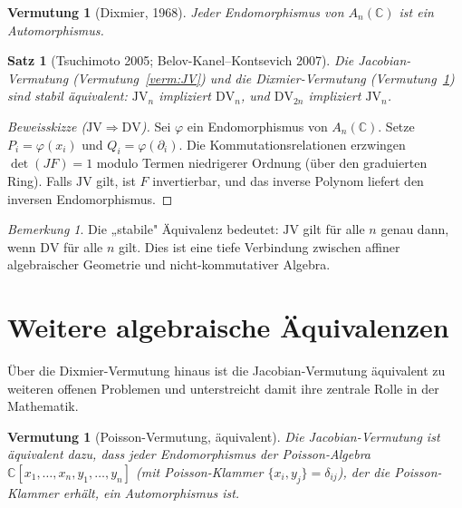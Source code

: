 \documentclass[12pt,a4paper]{amsart}
\newtheorem{satz}[theorem]{Satz}
\newtheorem{vermutung}[theorem]{Vermutung}
\theoremstyle{definition}
\theoremstyle{remark}
\newtheorem{bemerkung}[theorem]{Bemerkung}
\begin{document}
\begin{vermutung}[Dixmier, 1968]\label{verm:dixmier}
Jeder Endomorphismus von $A_n(\mathbb{C})$ ist ein Automorphismus.
\end{vermutung}

\begin{satz}[Tsuchimoto 2005; Belov-Kanel--Kontsevich 2007]\label{satz:JV=DV}
Die Jacobian-Vermutung (Vermutung~\ref{verm:JV}) und die Dixmier-Vermutung
(Vermutung~\ref{verm:dixmier}) sind stabil äquivalent: $\mathrm{JV}_n$ impliziert
$\mathrm{DV}_n$, und $\mathrm{DV}_{2n}$ impliziert $\mathrm{JV}_n$.
\end{satz}

\begin{proof}[Beweisskizze ($\mathrm{JV} \Rightarrow \mathrm{DV}$)]
Sei $\varphi$ ein Endomorphismus von $A_n(\mathbb{C})$. Setze $P_i = \varphi(x_i)$
und $Q_i = \varphi(\partial_i)$. Die Kommutationsrelationen erzwingen
$\det(JF) = 1$ modulo Termen niedrigerer Ordnung (über den graduierten Ring).
Falls $\mathrm{JV}$ gilt, ist $F$ invertierbar, und das inverse Polynom liefert
den inversen Endomorphismus.
\end{proof}

\begin{bemerkung}
Die „stabile" Äquivalenz bedeutet: $\mathrm{JV}$ gilt für alle $n$ genau dann,
wenn $\mathrm{DV}$ für alle $n$ gilt. Dies ist eine tiefe Verbindung zwischen
affiner algebraischer Geometrie und nicht-kommutativer Algebra.
\end{bemerkung}

\section{Weitere algebraische Äquivalenzen}
\label{abschn:equiv}

Über die Dixmier-Vermutung hinaus ist die Jacobian-Vermutung äquivalent zu weiteren
offenen Problemen und unterstreicht damit ihre zentrale Rolle in der Mathematik.

\begin{vermutung}[Poisson-Vermutung, äquivalent]\label{verm:poisson_equiv}
Die Jacobian-Vermutung ist äquivalent dazu, dass jeder Endomorphismus der
Poisson-Algebra $\mathbb{C}[x_1,\ldots,x_n, y_1,\ldots,y_n]$ (mit Poisson-Klammer
$\{x_i, y_j\} = \delta_{ij}$), der die Poisson-Klammer erhält, ein Automorphismus ist.
\end{vermutung}
\end{document}
